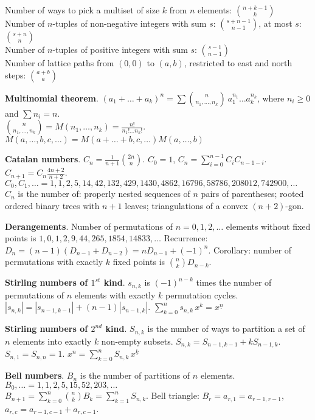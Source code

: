\documentclass[a4paper, 12pt]{article}
\let\ge=\geqslant
\newcommand{\Topic}[1]{\textbf{#1}}
\begin{document}
Number of ways to pick a multiset of size $k$ from $n$ elements: ${n+k-1 \choose k}$ \\
Number of $n$-tuples of non-negative integers with sum $s$:
${{s+n-1} \choose {n-1}}$, at most $s$: ${{s + n} \choose {n}}$ \\
Number of $n$-tuples of positive integers with sum $s$:
${{s-1} \choose {n-1}}$ \\
Number of lattice paths from $(0,0)$ to $(a,b)$, restricted to east and north
steps: ${a+b \choose a}$

\Topic{Multinomial theorem}.
$(a_1+\dots+a_k)^n = \sum {n \choose n_1,\dots,n_k}\ 
a_1^{n_1} \dots a_k^{n_k}$,
where $n_i \ge 0$ and $\sum n_i=n$. \\
${n \choose n_1,\dots,n_k} = M(n_1,\dots,n_k) = \frac{n!}{n_1! \dots n_k!}$.
$M(a,\dots,b,c,\dots) = M(a+\dots+b,c,\dots) M(a,\dots,b)$

\Topic{Catalan numbers}.
$C_n = \frac{1}{n+1} {2n \choose n}$.
\quad $C_0=1$, $C_n=\sum_{i=0}^{n-1} C_i C_{n-1-i}$.
\quad $C_{n+1} = C_n \frac{4n+2}{n+2}$. \\
$C_0, C_1, \ldots = 1, 1, 2, 5, 14, 42, 132, 429, 1430, 4862, 16796,
	58786, 208012, 742900, \ldots$ \\
$C_n$ is the number of:
properly nested sequences of $n$ pairs of parentheses;
rooted ordered binary trees with $n+1$ leaves;
triangulations of a convex $(n+2)$-gon.

\Topic{Derangements}.
Number of permutations of $n=0,1,2,\dots$ elements without fixed points is
$1, 0, 1, 2, 9, 44, 265, 1854, 14833, \dots$
Recurrence: $D_n = (n-1)(D_{n-1} + D_{n-2}) = n D_{n-1} + (-1)^n$.
Corollary: number of permutations with exactly $k$ fixed points is ${n \choose k} D_{n-k}$.

\Topic{Stirling numbers of $1^{st}$ kind}.
$s_{n,k}$ is $(-1)^{n-k}$ times the number of permutations of $n$ elements with
exactly $k$ permutation cycles.
$|s_{n,k}| = |s_{n-1,k-1}| + (n-1) |s_{n-1,k}|$. \quad
$\sum_{k=0}^n s_{n,k}\,x^k = x^{\underline n}$


\Topic{Stirling numbers of $2^{nd}$ kind}.
$S_{n,k}$ is the number of ways to partition a set of $n$ elements into
exactly $k$ non-empty subsets. 
$S_{n,k} = S_{n-1,k-1} + k S_{n-1,k}$.
$S_{n,1} = S_{n,n} = 1$.
$x^n = \sum_{k=0}^n S_{n,k}\,x^{\underline k}$

\Topic{Bell numbers}.
$B_n$ is the number of partitions of $n$ elements. 
$B_0, \ldots = 1,1,2,5,15,52,203,\ldots$ \\
$B_{n+1} = \sum_{k=0}^n {n \choose k} B_k = \sum_{k=1}^n S_{n,k}$.
Bell triangle: $B_r=a_{r,1}=a_{r-1,r-1}$, $a_{r,c}=a_{r-1,c-1}+a_{r,c-1}$.
\end{document}
